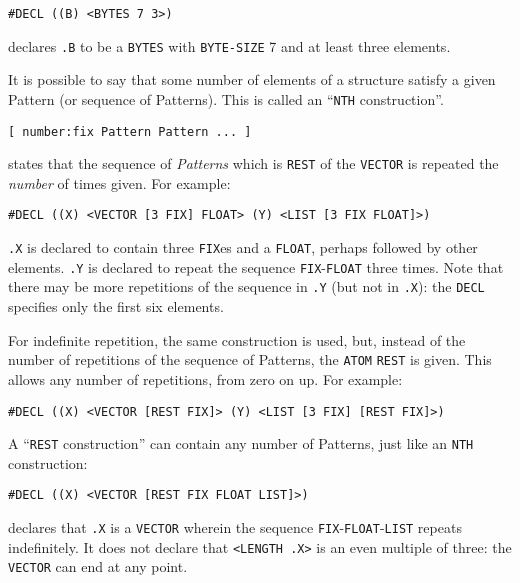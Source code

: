 \documentclass[a4paper]{scrbook}
\begin{document}
\begin{verbatim}
#DECL ((B) <BYTES 7 3>)
\end{verbatim}

declares \texttt{.B} to be a \texttt{BYTES} with \texttt{BYTE-SIZE} 7 and at least three elements.

It is possible to say that some number of elements of a structure satisfy a given Pattern (or sequence of Patterns). This
is called an ``\texttt{NTH} construction''.

\begin{verbatim}
[ number:fix Pattern Pattern ... ]
\end{verbatim}

states that the sequence of \emph{Patterns} which is \texttt{REST} of the \texttt{VECTOR} is
repeated the \emph{number} of times given. For example:

\begin{verbatim}
#DECL ((X) <VECTOR [3 FIX] FLOAT> (Y) <LIST [3 FIX FLOAT]>)
\end{verbatim}

\texttt{.X} is declared to contain three \texttt{FIX}es and a \texttt{FLOAT}, perhaps followed by other elements.
\texttt{.Y} is declared to repeat the sequence \texttt{FIX}-\texttt{FLOAT} three times. Note that there may be more
repetitions of the sequence in \texttt{.Y} (but not in \texttt{.X}): the \texttt{DECL} specifies only the first six
elements.

For indefinite repetition, the same construction is used, but, instead of the number of repetitions of the sequence of
Patterns, the \texttt{ATOM} \texttt{REST} is given. This allows any number of repetitions, from zero on up. For example:

\begin{verbatim}
#DECL ((X) <VECTOR [REST FIX]> (Y) <LIST [3 FIX] [REST FIX]>)
\end{verbatim}

A ``\texttt{REST} construction'' can contain any number of Patterns, just like an \texttt{NTH} construction:

\begin{verbatim}
#DECL ((X) <VECTOR [REST FIX FLOAT LIST]>)
\end{verbatim}

declares that \texttt{.X} is a \texttt{VECTOR} wherein the sequence \texttt{FIX}-\texttt{FLOAT}-\texttt{LIST} repeats
indefinitely. It does not declare that \texttt{\textless{}LENGTH\ .X\textgreater{}} is an even multiple of three: the
\texttt{VECTOR} can end at any point.
\end{document}
